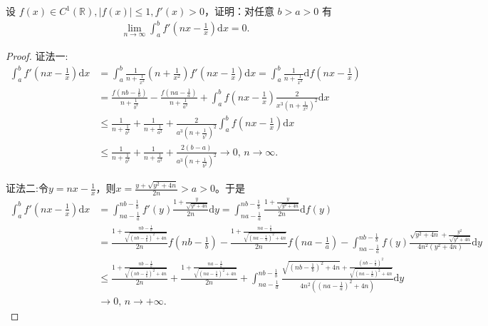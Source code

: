 \documentclass[../../main.tex]{subfiles}%
\begin{document}
\begin{example}
设 $f(x) \in C^1(\mathbb{R}), |f(x)| \leqslant  1, f'(x) > 0$，证明：对任意 $b > a > 0$ 有
\begin{align*}
\lim_{n\rightarrow \infty} \int_a^b{f' \left( nx-\frac{1}{x} \right) \mathrm{d}x}=0.
\end{align*}
\end{example}
\begin{proof}

{\color{blue}证法一:}\begin{align*}
\int_a^b f'\left(nx - \frac{1}{x}\right) \mathrm{d}x &= \int_a^b \frac{1}{n + \frac{1}{x^2}} \left(n + \frac{1}{x^2}\right) f'\left(nx - \frac{1}{x}\right) \mathrm{d}x = \int_a^b \frac{1}{n + \frac{1}{x^2}} \mathrm{d}f\left(nx - \frac{1}{x}\right) \\
&= \frac{f\left(nb - \frac{1}{b}\right)}{n + \frac{1}{b^2}} - \frac{f\left(na - \frac{1}{a}\right)}{n + \frac{1}{a^2}} + \int_a^b f\left(nx - \frac{1}{x}\right) \frac{2}{x^3 \left(n + \frac{1}{x^2}\right)^2} \mathrm{d}x \\
&\leqslant  \frac{1}{n + \frac{1}{b^2}} + \frac{1}{n + \frac{1}{a^2}} + \frac{2}{a^3 \left(n + \frac{1}{b^2}\right)^2} \int_a^b f\left(nx - \frac{1}{x}\right) \mathrm{d}x \\
&\leqslant  \frac{1}{n + \frac{1}{b^2}} + \frac{1}{n + \frac{1}{a^2}} + \frac{2(b - a)}{a^3 \left(n + \frac{1}{b^2}\right)^2} \rightarrow 0, \, n \rightarrow \infty.
\end{align*}

{\color{blue}证法二:}令$y = nx - \frac{1}{x}$，则$x = \frac{y + \sqrt{y^2 + 4n}}{2n} >a> 0$。于是
\begin{align*}
\int_a^b f'\left(nx - \frac{1}{x}\right) \mathrm{d}x &= \int_{na - \frac{1}{a}}^{nb - \frac{1}{b}} f'(y) \frac{1 + \frac{y}{\sqrt{y^2 + 4n}}}{2n} \mathrm{d}y = \int_{na - \frac{1}{a}}^{nb - \frac{1}{b}} \frac{1 + \frac{y}{\sqrt{y^2 + 4n}}}{2n} \mathrm{d}f(y) \\
&= \frac{1 + \frac{nb - \frac{1}{b}}{\sqrt{\left(nb - \frac{1}{b}\right)^2 + 4n}}}{2n} f\left(nb - \frac{1}{b}\right) - \frac{1 + \frac{na - \frac{1}{a}}{\sqrt{\left(na - \frac{1}{a}\right)^2 + 4n}}}{2n} f\left(na - \frac{1}{a}\right) - \int_{na - \frac{1}{a}}^{nb - \frac{1}{b}} f(y) \frac{\sqrt{y^2 + 4n} + \frac{y^2}{\sqrt{y^2 + 4n}}}{4n^2(y^2 + 4n)} \mathrm{d}y \\
&\leqslant  \frac{1 + \frac{nb - \frac{1}{b}}{\sqrt{\left(nb - \frac{1}{b}\right)^2 + 4n}}}{2n} + \frac{1 + \frac{na - \frac{1}{a}}{\sqrt{\left(na - \frac{1}{a}\right)^2 + 4n}}}{2n} + \int_{na - \frac{1}{a}}^{nb - \frac{1}{b}} \frac{\sqrt{\left(nb - \frac{1}{b}\right)^2 + 4n} + \frac{\left(nb - \frac{1}{b}\right)^2}{\sqrt{\left(na - \frac{1}{a}\right)^2 + 4n}}}{4n^2\left(\left(na - \frac{1}{a}\right)^2 + 4n\right)} \mathrm{d}y \\
&\rightarrow 0, \, n \rightarrow +\infty.
\end{align*}

\end{proof}
\end{document}
